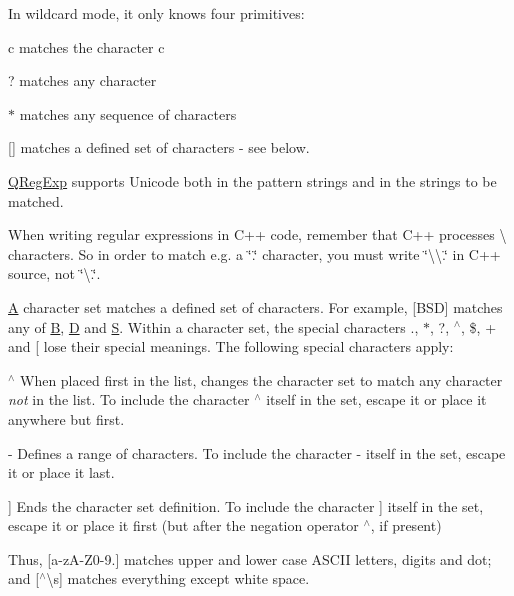In wildcard mode, it only knows four primitives\+: 
\begin{DoxyItemize}
\item {\ttfamily c} matches the character \textquotesingle{}c\textquotesingle{} 
\item {\ttfamily ?} matches any character 
\item {\ttfamily $\ast$} matches any sequence of characters 
\item {\ttfamily \mbox{[}\mbox{]}} matches a defined set of characters -\/ see below. 
\end{DoxyItemize}

\mbox{\hyperlink{class_q_reg_exp}{Q\+Reg\+Exp}} supports Unicode both in the pattern strings and in the strings to be matched.

When writing regular expressions in C++ code, remember that C++ processes \textbackslash{} characters. So in order to match e.\+g. a \char`\"{}.\char`\"{} character, you must write \char`\"{}\textbackslash{}\textbackslash{}.\char`\"{} in C++ source, not \char`\"{}\textbackslash{}.\char`\"{}.

\mbox{\hyperlink{class_a}{A}} character set matches a defined set of characters. For example, \mbox{[}B\+SD\mbox{]} matches any of \textquotesingle{}\mbox{\hyperlink{class_b}{B}}\textquotesingle{}, \textquotesingle{}\mbox{\hyperlink{class_d}{D}}\textquotesingle{} and \textquotesingle{}\mbox{\hyperlink{struct_s}{S}}\textquotesingle{}. Within a character set, the special characters \textquotesingle{}.\textquotesingle{}, \textquotesingle{}$\ast$\textquotesingle{}, \textquotesingle{}?\textquotesingle{}, \textquotesingle{}$^\wedge$\textquotesingle{}, \textquotesingle{}\$\textquotesingle{}, \textquotesingle{}+\textquotesingle{} and \textquotesingle{}\mbox{[}\textquotesingle{} lose their special meanings. The following special characters apply\+: 
\begin{DoxyItemize}
\item {\ttfamily $^\wedge$} When placed first in the list, changes the character set to match any character {\itshape not} in the list. To include the character \textquotesingle{}$^\wedge$\textquotesingle{} itself in the set, escape it or place it anywhere but first. 
\item {\ttfamily -\/} Defines a range of characters. To include the character \textquotesingle{}-\/\textquotesingle{} itself in the set, escape it or place it last. 
\item {\ttfamily \mbox{]}} Ends the character set definition. To include the character \textquotesingle{}\mbox{]}\textquotesingle{} itself in the set, escape it or place it first (but after the negation operator \textquotesingle{}$^\wedge$\textquotesingle{}, if present) 
\end{DoxyItemize}Thus, \mbox{[}a-\/z\+A-\/\+Z0-\/9.\mbox{]} matches upper and lower case A\+S\+C\+II letters, digits and dot; and \mbox{[}$^\wedge$\textbackslash{}s\mbox{]} matches everything except white space.

